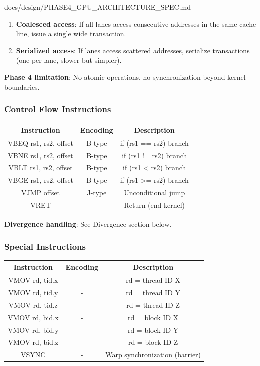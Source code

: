\begin{relocated}{docs/design/PHASE4_GPU_ARCHITECTURE_SPEC.md}
\begin{enumerate}
\def\labelenumi{\arabic{enumi}.}
\item
  \textbf{Coalesced access}: If all lanes access consecutive addresses
  in the same cache line, issue a single wide transaction.
\item
  \textbf{Serialized access}: If lanes access scattered addresses,
  serialize transactions (one per lane, slower but simpler).
\end{enumerate}

\textbf{Phase 4 limitation}: No atomic operations, no synchronization
beyond kernel boundaries.

\subsubsection{Control Flow Instructions}\label{ds:ch:phase4-gpu-architecture:control-flow-instructions}

{
\begin{longtable}[]{@{}ccc@{}}
\toprule\noalign{}
Instruction & Encoding & Description \\
\midrule\noalign{}
\endhead
\bottomrule\noalign{}
\endlastfoot
VBEQ rs1, rs2, offset & B-type & if (rs1 == rs2) branch \\
VBNE rs1, rs2, offset & B-type & if (rs1 != rs2) branch \\
VBLT rs1, rs2, offset & B-type & if (rs1 \textless{} rs2) branch \\
VBGE rs1, rs2, offset & B-type & if (rs1 \textgreater= rs2) branch \\
VJMP offset & J-type & Unconditional jump \\
VRET & - & Return (end kernel) \\
\end{longtable}
}

\textbf{Divergence handling}: See Divergence section below.

\subsubsection{Special Instructions}\label{ds:ch:phase4-gpu-architecture:special-instructions}

{
\begin{longtable}[]{@{}ccc@{}}
\toprule\noalign{}
Instruction & Encoding & Description \\
\midrule\noalign{}
\endhead
\bottomrule\noalign{}
\endlastfoot
VMOV rd, tid.x & - & rd = thread ID X \\
VMOV rd, tid.y & - & rd = thread ID Y \\
VMOV rd, tid.z & - & rd = thread ID Z \\
VMOV rd, bid.x & - & rd = block ID X \\
VMOV rd, bid.y & - & rd = block ID Y \\
VMOV rd, bid.z & - & rd = block ID Z \\
VSYNC & - & Warp synchronization (barrier) \\
\end{longtable}
}


\end{relocated}
